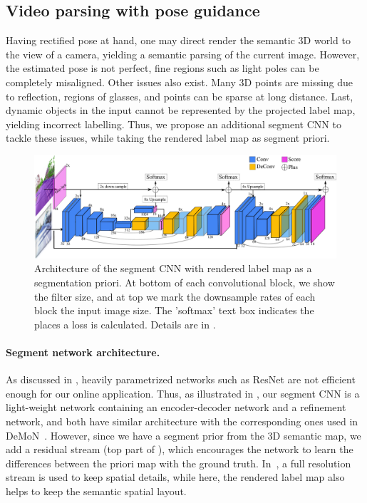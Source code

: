 \subsection{Video parsing with pose guidance}
\label{subsec:parsing}
Having rectified pose at hand, one may direct render the semantic 3D world to the view of a camera, yielding a semantic parsing of the current image. However, the estimated pose is not perfect, fine regions such as light poles can be completely misaligned. Other issues also exist. Many 3D points are missing due to reflection, \eg regions of glasses, and points can be sparse at long distance. Last, dynamic objects in the input cannot be represented by the projected label map, yielding incorrect labelling. Thus, we propose an additional segment CNN to tackle these issues, while taking the rendered label map as segment priori.

\begin{figure}[]
\includegraphics[width=\textwidth]{fig/segCNN.pdf}
\caption{Architecture of the segment CNN with rendered label map as a segmentation priori. At bottom of each convolutional block, we show the filter size, and at top we mark the downsample rates of each block \wrt the input image size. The 'softmax' text box indicates the places a loss is calculated. Details are in .}
\label{fig:segnet}
\end{figure}

\paragraph{Segment network architecture.} As discussed in , heavily parametrized networks such as ResNet are not efficient enough for our online application. Thus, as illustrated in , our segment CNN is a light-weight network containing an encoder-decoder network and a refinement network, and both have similar architecture with the corresponding ones used in DeMoN~\cite{ummenhofer2016demon}. However, since we have a segment prior from the 3D semantic map, we add a residual stream (top part of ), which encourages the network to learn the differences between the priori map with the ground truth. In~\cite{pohlen2016full}, a full resolution stream is used to keep spatial details, while here, the rendered label map also helps to keep the semantic spatial layout.

